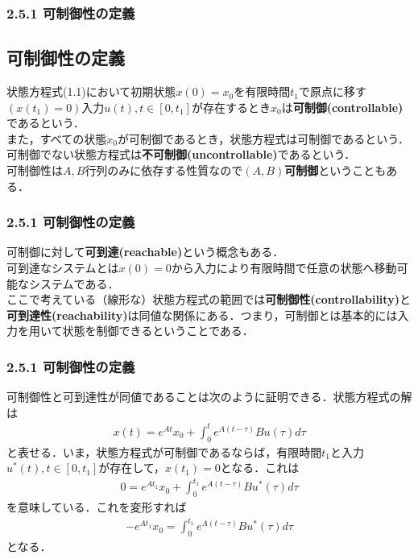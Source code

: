\begin{frame}[t]
\frametitle{2.5.1 可制御性の定義}
\subsection{可制御性の定義}

状態方程式(1.1)において初期状態$x(0)=x_0$を有限時間$t_1$で原点に移す$(x(t_1)=0)$入力$u(t), t\in[0,t_1]$が存在するとき$x_0$は{\bf 可制御(controllable)}であるという．
\\[3mm]

また，すべての状態$x_0$が可制御であるとき，状態方程式は可制御であるという．
\\[3mm]

可制御でない状態方程式は{\bf 不可制御(uncontrollable)}であるという．
\\[3mm]

可制御性は$A,B$行列のみに依存する性質なので{\bf $(A,B)$可制御}ということもある．

\end{frame}

\begin{frame}[t]
\frametitle{2.5.1 可制御性の定義}
可制御に対して{\bf 可到達(reachable)}という概念もある．
\\[3mm]

可到達なシステムとは$x(0)=0$から入力により有限時間で任意の状態へ移動可能なシステムである．
\\[3mm]

ここで考えている（線形な）状態方程式の範囲では{\bf 可制御性(controllability)}と{\bf 可到達性(reachability)}は同値な関係にある．つまり，可制御とは基本的には入力を用いて状態を制御できるということである．

\end{frame}

\begin{frame}[t]
\frametitle{2.5.1 可制御性の定義}
可制御性と可到達性が同値であることは次のように証明できる．状態方程式の解は
\begin{align}
	x(t) = e^{At} x_0 + \int_0^t e^{A(t-\tau)} B u (\tau) d \tau
\end{align}
と表せる．いま，状態方程式が可制御であるならば，有限時間$t_1$と入力$u^*(t), t\in[0,t_1]$が存在して，$x(t_1)=0$となる．これは
\begin{align}
	0 = e^{At_1} x_0 + \int_0^{t_1} e^{A(t-\tau)} B u^* (\tau) d \tau
\end{align}
を意味している．これを変形すれば
\begin{align}
	-e^{At_1} x_0 = \int_0^{t_1} e^{A(t-\tau)} B u^* (\tau) d \tau
\end{align}
となる．
\end{frame}


